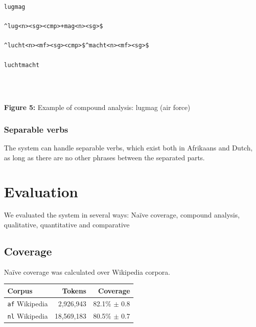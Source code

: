 \documentclass[a0,landscape]{a0poster}
\begin{document}
\begin{multicols}{4}
\begin{center}
\begin{minipage}[b]{26cm}
\begin{small}
\begin{verbatim}
lugmag

^lug<n><sg><cmp>+mag<n><sg>$

^lucht<n><mf><sg><cmp>$^macht<n><mf><sg>$

luchtmacht
\end{verbatim}
\end{small}
\end{minipage}\\
\end{center}
~\\
\textbf{Figure 5:} Example of compound analysis: lugmag (air force)



\subsubsection{Separable verbs}

\noindent
The system can handle separable verbs, which exist both in Afrikaans and Dutch, as
long as there are no other phrases between the separated parts.\\

\section{Evaluation}
\noindent
We evaluated the system in several ways: Naïve coverage, compound analysis, qualitative, quantitative and comparative

\subsection{Coverage}

\noindent
Naïve coverage was calculated over Wikipedia corpora.\\


\begin{minipage}[b]{25cm}
\begin{center}
  \begin{tabular}{|l|r|r|}
   \hline
   {\bf Corpus}           & {\bf Tokens}    & {\bf Coverage}\\
   \hline
   {\tt af} Wikipedia     & 2,926,943       & 82.1\% $\pm$ 0.8 \\
   \hline
   {\tt nl} Wikipedia     & 18,569,183      & 80.5\% $\pm$ 0.7 \\
   \hline
  \end{tabular}
    

\end{center}
\end{minipage}
\end{multicols}
\end{document}
